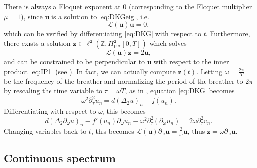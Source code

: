 \documentclass[12pt,reqno]{amsart}
\def\Z{{\mathbb Z}}
\def\per{\textrm{per}}
\def\calL{\mathcal{L}}
\newcommand{\uvec}{\mathbf{u}}
\newcommand{\zvec}{\mathbf{z}}
\begin{document}
There is always a Floquet exponent at 0 (corresponding to the Floquet multiplier $\mu = 1$), since $\dot{\uvec}$ is a solution to \cref{eq:DKGeig}, i.e.
\begin{equation}\label{eq:Lkernel1}
\calL(\uvec)\dot{\uvec} = 0,
\end{equation}
which can be verified by differentiating \cref{eq:DKG} with respect to $t$. Furthermore, there exists a solution $\zvec \in \ell^2(\Z, H^2_\per[0,T])$ which solves 
\begin{equation}
\calL(\uvec)\zvec = 2 \ddot{\uvec},
\end{equation}
and can be constrained to be perpendicular to $\dot{\uvec}$ with respect to the inner product \cref{eq:IP1} (see \cite[Section 3]{Pelinovsky2012}). In fact, we can actually compute $\zvec(t)$. 
Letting $\omega = \frac{2 \pi}{T}$ be the frequency of the breather and normalizing the period of the breather to $2 \pi$ by rescaling the time variable to $\tau = \omega T$, as in \cite{kevrekidis2016}, equation \cref{eq:DKG} becomes
\begin{equation}\label{eq:DKGomega}
\omega^2 \partial_\tau^2 u_n = d (\Delta_2 u)_n - f(u_n).
\end{equation}
Differentiating with respect to $\omega$, this becomes
\begin{equation}\label{eq:DKGdiffw}
d (\Delta_2 \partial_\omega u)_n - f'(u_n)\partial_\omega u_n 
- \omega^2 \partial_\tau^2 ( \partial_\omega u_n) = 2 \omega \partial_\tau^2 u_n.
\end{equation}
Changing variables back to $t$, this becomes $\calL(\uvec)\partial_\omega \uvec = \frac{2}\omega \ddot{\uvec}$, thus $\zvec = \omega \partial_\omega \uvec$.

\subsection{Continuous spectrum}
\end{document}
